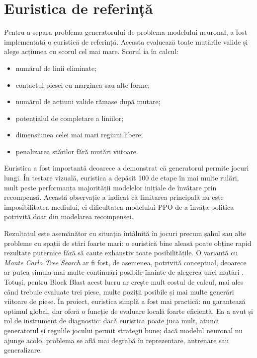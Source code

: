 \documentclass[12pt,a4paper]{article}
\begin{document}
\section{Euristica de referință}

Pentru a separa problema generatorului de problema modelului neuronal, a fost implementată o euristică de referință. Aceasta evaluează toate mutările valide și alege acțiunea cu scorul cel mai mare. Scorul ia în calcul:
\begin{itemize}
    \item numărul de linii eliminate;
    \item contactul piesei cu marginea sau alte forme;
    \item numărul de acțiuni valide rămase după mutare;
    \item potențialul de completare a liniilor;
    \item dimensiunea celei mai mari regiuni libere;
    \item penalizarea stărilor fără mutări viitoare.
\end{itemize}

Euristica a fost importantă deoarece a demonstrat că generatorul permite jocuri lungi. În testare vizuală, euristica a depășit 100 de etape în mai multe rulări, mult peste performanța majorității modelelor inițiale de învățare prin recompensă. Această observație a indicat că limitarea principală nu este imposibilitatea mediului, ci dificultatea modelului PPO de a învăța politica potrivită doar din modelarea recompensei.

Rezultatul este asemănător cu situația întâlnită în jocuri precum șahul sau alte probleme cu spații de stări foarte mari: o euristică bine aleasă poate obține rapid rezultate puternice fără să caute exhaustiv toate posibilitățile. O variantă cu \textit{Monte Carlo Tree Search} ar fi fost, de asemenea, potrivită conceptual, deoarece ar putea simula mai multe continuări posibile înainte de alegerea unei mutări \cite{kocsis2006bandit}. Totuși, pentru Block Blast acest lucru ar crește mult costul de calcul, mai ales când trebuie evaluate trei piese, multe poziții posibile și mai multe generări viitoare de piese. În proiect, euristica simplă a fost mai practică: nu garantează optimul global, dar oferă o funcție de evaluare locală foarte eficientă. Ea a avut și rol de instrument de diagnostic: dacă euristica poate juca mult, atunci generatorul și regulile jocului permit strategii bune; dacă modelul neuronal nu ajunge acolo, problema se află mai degrabă în reprezentare, antrenare sau generalizare.
\end{document}
